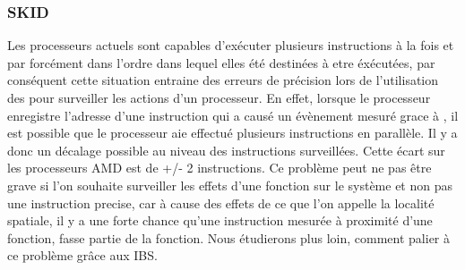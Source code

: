 					\subsubsection{SKID}
						Les processeurs actuels sont capables d'exécuter plusieurs instructions à la fois et par forcément dans l'ordre dans lequel elles été destinées à etre éxécutées, par conséquent cette situation entraine des erreurs de précision lors de l'utilisation des \PMC pour surveiller les actions d'un processeur. En effet, lorsque le processeur enregistre l'adresse d'une instruction qui a causé un évènement mesuré grace à \PMC, il est possible que le processeur aie effectué plusieurs instructions en parallèle. Il y a donc un décalage possible au niveau des instructions surveillées. Cette écart sur les processeurs AMD est de +/- 2 instructions. Ce problème peut ne pas être grave si l'on souhaite surveiller les effets d'une fonction sur le système et non pas une instruction precise, car à cause des effets de ce que l'on appelle la localité spatiale, il y a une forte chance qu'une instruction mesurée à proximité d'une fonction, fasse partie de la fonction. Nous étudierons plus loin, comment palier à ce problème grâce aux IBS.
